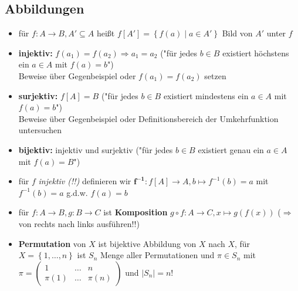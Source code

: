 \documentclass[10pt,a4paper]{article}
\begin{document}
\subsection{Abbildungen}
\begin{itemize}
\item für $f: A\rightarrow B, A'\subseteq A$ heißt $f[A']=\left\lbrace f(a)\mid a \in A'\right\rbrace$ Bild von $A'$ unter $f$
\item \textbf{injektiv:} $f(a_{1})=f(a_{2}) \Rightarrow a_{1}=a_{2}$ ("für jedes $b\in B$ existiert höchstens ein $a\in A$ mit $f(a)=b$")\\
Beweise über Gegenbeispiel oder $f(a_{1})=f(a_{2})$ setzen 
\item \textbf{surjektiv:} $f[A]=B$ ("für jedes $b\in B$ existiert mindestens ein $a\in A$ mit $f(a)=b$")\\ Beweise über Gegenbeispiel oder Definitionsbereich der Umkehrfunktion untersuchen 
\item \textbf{bijektiv:} injektiv und surjektiv ("für jedes $b\in B $ existiert genau ein $a\in A$ mit $f(a)=B$")
\item für $f$ \textit{injektiv (!!)}  definieren wir $\boldsymbol{f^{-1}: }f[A]\rightarrow A, b\mapsto f^{-1}(b)=a$ mit $f^{-1}(b)=a$  g.d.w. $f(a)=b$
\item für $f:A\rightarrow B, g: B\rightarrow C$ ist \textbf{Komposition} $ g\circ f:A\rightarrow C, x \mapsto g(f(x))$ ($\Rightarrow$ von rechts nach links ausführen!!)
\item \textbf{Permutation} von $X$ ist bijektive Abbildung von $X$ nach $X$, für $X=\left\lbrace 1,\dotsc, n\right\rbrace$ ist $S_{n}$ Menge aller Permutationen und $\pi \in S_{n}$ mit $\pi=\begin{pmatrix}1&\dotsc& n\\ \pi(1)&\dotsc &\pi(n)\end{pmatrix} $ und $\vert S_{n}\vert =n!$
\end{itemize}
\end{document}
